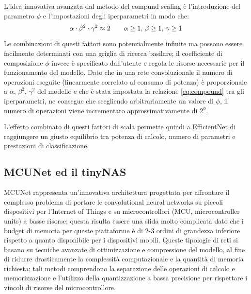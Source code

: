 L'idea innovativa avanzata dal metodo del compund scaling è l'introduzione del parametro $\phi$ e l'impostazioni degli iperparametri in modo che:
\begin{equation}
  \centering
  \alpha \cdot \beta^{2} \cdot \gamma^{2} \approx 2 \qquad \alpha \ge 1, \, \beta \ge 1, \, \gamma \ge 1
  \label{eq:compound}
\end{equation}

Le combinazioni di questi fattori sono potenzialmente infinite ma possono essere facilmente determinati con una griglia di ricerca basilare; il coefficiente di composizione $\phi$ invece è specificato dall'utente e regola le risorse necessarie per il funzionamento del modello. Dato che in una rete convoluzionale il numero di operazioni eseguite (linearmente correlato al consumo di potenza) è proporzionale a $\alpha$, $\beta^{2}$, $\gamma^{2}$ del modello e che è stata impostata la relazione \ref{eq:compound} tra gli iperparametri, ne consegue che scegliendo arbitrariamente un valore di $\phi$, il numero di operazioni viene incrementato approssimativamente di $2^{\phi}$.

L'effetto combinato di questi fattori di scala permette quindi a EfficientNet di raggiungere un giusto equilibrio tra potenza di calcolo, numero di parametri e prestazioni di classificazione.

\subsection{MCUNet ed il tinyNAS}

MCUNet rappresenta un'innovativa architettura progettata per affrontare il complesso problema di portare le convolutional neural networks su piccoli dispositivi per l'Internet of Things e su microcontrollori (MCU, microcontroller units) a basse risorse; questa risulta essere una sfida molto complicata dato che i budget di memoria per queste piattaforme è di 2-3 ordini di grandezza inferiore rispetto a quanto disponibile per i dispositivi mobili.
Queste tipologie di reti si basano su tecniche avanzate di ottimizzazione e compressione del modello, al fine di ridurre drasticamente la complessità computazionale e la quantità di memoria richiesta; tali metodi comprendono la separazione delle operazioni di calcolo e memorizzazione e l'utilizzo della quantizzazione a bassa precisione per rispettare i vincoli di risorse del microcontrollore.

